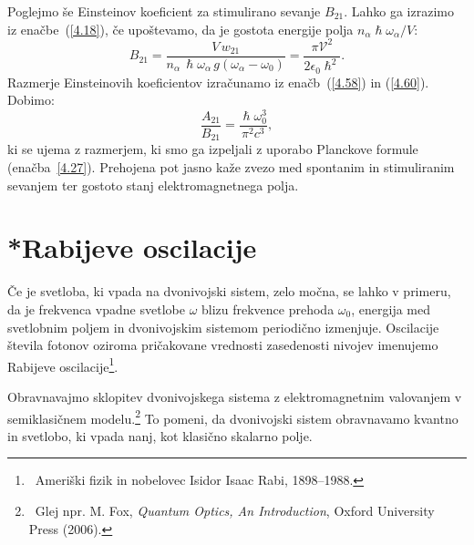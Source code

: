 Poglejmo še Einsteinov koeficient za stimulirano sevanje $B_{21}$. Lahko ga 
izrazimo iz enačbe~(\ref{4.18}), če upoštevamo, da je gostota energije 
polja $n_{\alpha}\hslash\omega_{\alpha}/V$:
\begin{equation}
B_{21}=\frac{V\,w_{21}}{n_{\alpha}\,\hslash\omega_{\alpha}\, g(\omega_{\alpha}-\omega_0)}
=\frac{\pi \mathcal{V}^{2}}{2\epsilon_{0}\hslash^{2}}.
\label{4.60}
\end{equation}
Razmerje Einsteinovih koeficientov izračunamo iz enačb~(\ref{4.58}) in 
(\ref{4.60}). Dobimo:
\begin{equation}
 \frac{A_{21}}{B_{21}}=\frac{\hslash \omega_0^3}{\pi^2 c^3},
\end{equation}
ki se ujema z razmerjem, ki smo ga izpeljali z uporabo
Planckove formule (enačba~\ref{4.27}). Prehojena pot jasno kaže zvezo med spontanim in
stimuliranim sevanjem ter gostoto stanj elektromagnetnega polja. 

\section{*Rabijeve oscilacije}
Če je svetloba, ki vpada na dvonivojski sistem, zelo močna, se lahko v primeru, da je frekvenca 
vpadne svetlobe $\omega$ blizu frekvence prehoda $\omega_0$, energija med 
svetlobnim poljem in dvonivojskim sistemom periodično izmenjuje. 
Oscilacije števila fotonov oziroma pričakovane 
vrednosti zasedenosti nivojev imenujemo Rabijeve 
oscilacije\footnote{~Ameriški fizik in nobelovec Isidor Isaac Rabi, 1898--1988.}. 

Obravnavajmo sklopitev dvonivojskega sistema z elektromagnetnim valovanjem 
v semiklasičnem modelu.\footnote{~Glej npr. M. Fox, {\it Quantum Optics, 
An Introduction}, Oxford University Press (2006).} 
To pomeni, da dvonivojski sistem obravnavamo kvantno in 
svetlobo, ki vpada nanj, kot klasično skalarno polje. 

